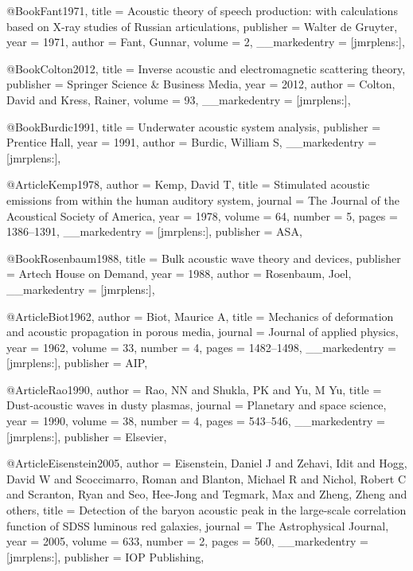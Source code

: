 {{{@Book{Fant1971,
  title         = {Acoustic theory of speech production: with calculations based on X-ray studies of Russian articulations},
  publisher     = {Walter de Gruyter},
  year          = {1971},
  author        = {Fant, Gunnar},
  volume        = {2},
  __markedentry = {[jmrplens:]},
}

@Book{Colton2012,
  title         = {Inverse acoustic and electromagnetic scattering theory},
  publisher     = {Springer Science \& Business Media},
  year          = {2012},
  author        = {Colton, David and Kress, Rainer},
  volume        = {93},
  __markedentry = {[jmrplens:]},
}

@Book{Burdic1991,
  title         = {Underwater acoustic system analysis},
  publisher     = {Prentice Hall},
  year          = {1991},
  author        = {Burdic, William S},
  __markedentry = {[jmrplens:]},
}

@Article{Kemp1978,
  author        = {Kemp, David T},
  title         = {Stimulated acoustic emissions from within the human auditory system},
  journal       = {The Journal of the Acoustical Society of America},
  year          = {1978},
  volume        = {64},
  number        = {5},
  pages         = {1386--1391},
  __markedentry = {[jmrplens:]},
  publisher     = {ASA},
}

@Book{Rosenbaum1988,
  title         = {Bulk acoustic wave theory and devices},
  publisher     = {Artech House on Demand},
  year          = {1988},
  author        = {Rosenbaum, Joel},
  __markedentry = {[jmrplens:]},
}

@Article{Biot1962,
  author        = {Biot, Maurice A},
  title         = {Mechanics of deformation and acoustic propagation in porous media},
  journal       = {Journal of applied physics},
  year          = {1962},
  volume        = {33},
  number        = {4},
  pages         = {1482--1498},
  __markedentry = {[jmrplens:]},
  publisher     = {AIP},
}

@Article{Rao1990,
  author        = {Rao, NN and Shukla, PK and Yu, M Yu},
  title         = {Dust-acoustic waves in dusty plasmas},
  journal       = {Planetary and space science},
  year          = {1990},
  volume        = {38},
  number        = {4},
  pages         = {543--546},
  __markedentry = {[jmrplens:]},
  publisher     = {Elsevier},
}

@Article{Eisenstein2005,
  author        = {Eisenstein, Daniel J and Zehavi, Idit and Hogg, David W and Scoccimarro, Roman and Blanton, Michael R and Nichol, Robert C and Scranton, Ryan and Seo, Hee-Jong and Tegmark, Max and Zheng, Zheng and others},
  title         = {Detection of the baryon acoustic peak in the large-scale correlation function of SDSS luminous red galaxies},
  journal       = {The Astrophysical Journal},
  year          = {2005},
  volume        = {633},
  number        = {2},
  pages         = {560},
  __markedentry = {[jmrplens:]},
  publisher     = {IOP Publishing},
}

}}}

